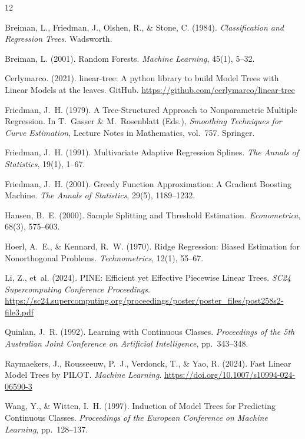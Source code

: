 \documentclass[11pt,a4paper]{article}
\begin{document}
\begin{thebibliography}{12}

Breiman, L., Friedman, J., Olshen, R., \& Stone, C. (1984).
\newblock \emph{Classification and Regression Trees}.
\newblock Wadsworth.

Breiman, L. (2001).
\newblock Random Forests.
\newblock \emph{Machine Learning}, 45(1), 5--32.

Cerlymarco. (2021).
\newblock linear-tree: A python library to build Model Trees with Linear Models at the leaves.
\newblock GitHub. \url{https://github.com/cerlymarco/linear-tree}

Friedman, J.~H. (1979).
\newblock A Tree-Structured Approach to Nonparametric Multiple Regression.
\newblock In T.~Gasser \& M.~Rosenblatt (Eds.), \emph{Smoothing Techniques for Curve Estimation}, Lecture Notes in Mathematics, vol.~757. Springer.

Friedman, J.~H. (1991).
\newblock Multivariate Adaptive Regression Splines.
\newblock \emph{The Annals of Statistics}, 19(1), 1--67.

Friedman, J.~H. (2001).
\newblock Greedy Function Approximation: A Gradient Boosting Machine.
\newblock \emph{The Annals of Statistics}, 29(5), 1189--1232.

Hansen, B.~E. (2000).
\newblock Sample Splitting and Threshold Estimation.
\newblock \emph{Econometrica}, 68(3), 575--603.

Hoerl, A.~E., \& Kennard, R.~W. (1970).
\newblock Ridge Regression: Biased Estimation for Nonorthogonal Problems.
\newblock \emph{Technometrics}, 12(1), 55--67.

Li, Z., et~al. (2024).
\newblock PINE: Efficient yet Effective Piecewise Linear Trees.
\newblock \emph{SC24 Supercomputing Conference Proceedings}.
\newblock \url{https://sc24.supercomputing.org/proceedings/poster/poster_files/post258s2-file3.pdf}

Quinlan, J.~R. (1992).
\newblock Learning with Continuous Classes.
\newblock \emph{Proceedings of the 5th Australian Joint Conference on Artificial Intelligence}, pp.~343--348.

Raymaekers, J., Rousseeuw, P.~J., Verdonck, T., \& Yao, R. (2024).
\newblock Fast Linear Model Trees by PILOT.
\newblock \emph{Machine Learning}.
\newblock \url{https://doi.org/10.1007/s10994-024-06590-3}

Wang, Y., \& Witten, I.~H. (1997).
\newblock Induction of Model Trees for Predicting Continuous Classes.
\newblock \emph{Proceedings of the European Conference on Machine Learning}, pp.~128--137.

\end{thebibliography}
\end{document}
